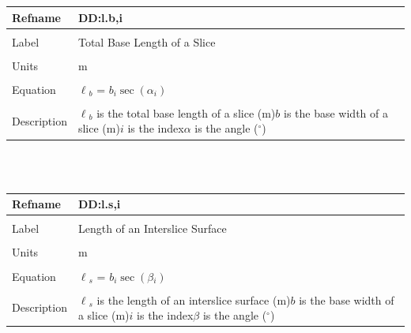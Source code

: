 \documentclass[12pt]{article}
\begin{document}
\noindent \begin{minipage}{\textwidth}
\begin{tabular}{p{} p{}}
\toprule \textbf{Refname} & \textbf{DD:l.b,i}
\label{DD:l.b,i}
\\ \midrule \\
Label & Total Base Length of a Slice
\\ \midrule \\
Units & m
\\ \midrule \\
Equation & ${\ell{}_{b}}$ = $b_{i} \sec\left(\alpha{}_{i}\right)$
\\ \midrule \\
Description & ${\ell{}_{b}}$ is the total base length of a slice (m)\newline$b$ is the base width of a slice (m)\newline$i$ is the index\newline$\alpha{}$ is the angle (${}^{\circ}$)
\\ \bottomrule \end{tabular}
\end{minipage}\\
~\newline
\noindent \begin{minipage}{\textwidth}
\begin{tabular}{p{} p{}}
\toprule \textbf{Refname} & \textbf{DD:l.s,i}
\label{DD:l.s,i}
\\ \midrule \\
Label & Length of an Interslice Surface
\\ \midrule \\
Units & m
\\ \midrule \\
Equation & ${\ell{}_{s}}$ = $b_{i} \sec\left(\beta{}_{i}\right)$
\\ \midrule \\
Description & ${\ell{}_{s}}$ is the length of an interslice surface (m)\newline$b$ is the base width of a slice (m)\newline$i$ is the index\newline$\beta{}$ is the angle (${}^{\circ}$)
\\ \bottomrule \end{tabular}
\end{minipage}\\
~\newline
\end{document}
